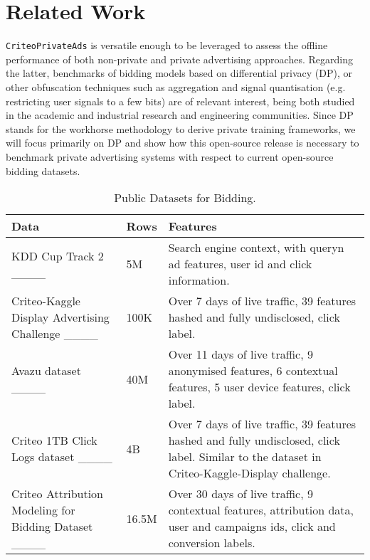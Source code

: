 \section{Related Work}
\label{sec:related_work}

\texttt{CriteoPrivateAds} is versatile enough to be leveraged to assess the offline performance of both non-private and private advertising approaches. 
Regarding the latter, benchmarks of bidding models based on differential privacy (DP), or other obfuscation techniques such as aggregation and signal quantisation (e.g. restricting user signals to a few bits) are of relevant interest, being both studied in the academic and industrial research and engineering communities.
Since DP stands for the workhorse methodology to derive private training frameworks, we will focus primarily on DP and show how this open-source release is necessary to benchmark private advertising systems with respect to current open-source bidding datasets.\\

\begin{table}[ht]
\centering
\renewcommand{\arraystretch}{1.2} %
\footnotesize
\begin{tabular}{|p{2cm}|p{1cm}|p{3.3cm}|}
\hline
\textbf{Data} & \textbf{Rows} & \textbf{Features} \\ \hline 
KDD Cup Track 2 ____ & 5M & Search engine context, with queryn ad features, user id and click information.\\ \hline
Criteo-Kaggle Display Advertising Challenge ____ 
& 100K  &  Over 7 days of live traffic, 39 features hashed and fully undisclosed, click label.  \\ \hline
Avazu dataset ____ & 40M & Over 11 days of live traffic, 9 anonymised features, 6 contextual features, 5 user device features, click label. \\ \hline
Criteo 1TB Click Logs dataset ____
 & 4B  & Over 7 days of live traffic, 39 features hashed and fully undisclosed, click label. Similar to the dataset in Criteo-Kaggle-Display challenge. \\ \hline
 Criteo Attribution Modeling for Bidding Dataset ____
 & 16.5M  & Over 30 days of live traffic, 9 contextual features, attribution data, user and campaigns ids, click and conversion labels. \\ \hline
\end{tabular}
\caption{Public Datasets for Bidding.}
\label{tab:dataset_overview}
\end{table}

